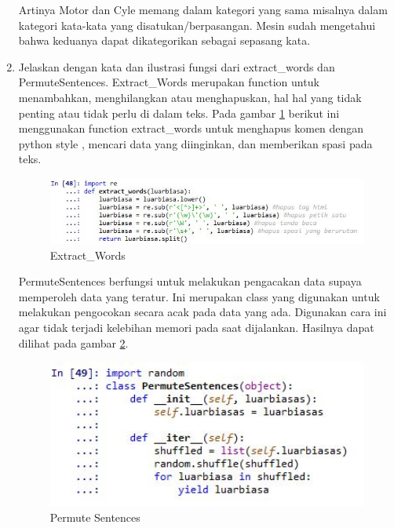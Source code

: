 \begin{enumerate}
\subitem Artinya Motor dan Cyle memang dalam kategori yang sama misalnya dalam kategori kata-kata yang disatukan/berpasangan. Mesin sudah mengetahui bahwa keduanya dapat dikategorikan sebagai sepasang kata.
\item Jelaskan dengan kata dan ilustrasi fungsi dari extract\_words dan PermuteSentences.
\subitem Extract\_Words merupakan function untuk menambahkan, menghilangkan atau menghapuskan, hal hal yang tidak penting atau tidak perlu di dalam teks. Pada gambar \ref{c5_20} berikut ini menggunakan function extract\_words untuk menghapus komen dengan python style , mencari data yang diinginkan, dan memberikan spasi pada teks.
\begin{figure}[ht]
	\centerline{\includegraphics[width=1\textwidth]{figures/huda/chapter5/20.JPG}}
	\caption{Extract\_Words}
	\label{c5_20}
\end{figure}
\subitem PermuteSentences berfungsi untuk melakukan pengacakan data supaya memperoleh data yang teratur. Ini merupakan class yang digunakan untuk melakukan pengocokan secara acak pada data yang ada. Digunakan cara ini agar tidak terjadi kelebihan memori pada saat dijalankan. Hasilnya dapat dilihat pada gambar \ref{c5_21}.
\begin{figure}[ht]
	\centerline{\includegraphics[width=1\textwidth]{figures/huda/chapter5/21.JPG}}
	\caption{Permute Sentences}
	\label{c5_21}
\end{figure}
\end{enumerate}